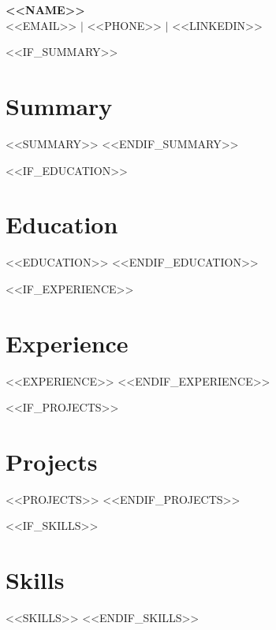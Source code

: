 \documentclass[11pt]{article}
\begin{document}
\begin{center}
    {\fontsize{36}{36}\selectfont\textbf{<<NAME>>}} \\ \bigskip
    {\color{icnclr}\faEnvelope[regular]} <<EMAIL>> $|$ 
    {\color{icnclr}} <<PHONE>> $|$
    {\color{icnclr}\faLinkedinIn} <<LINKEDIN>>
\end{center}

<<IF_SUMMARY>>
\section{Summary}
<<SUMMARY>>
<<ENDIF_SUMMARY>>

<<IF_EDUCATION>>
\section{Education}
<<EDUCATION>>
<<ENDIF_EDUCATION>>

<<IF_EXPERIENCE>>
\section{Experience}
<<EXPERIENCE>>
<<ENDIF_EXPERIENCE>>

<<IF_PROJECTS>>
\section{Projects}
<<PROJECTS>>
<<ENDIF_PROJECTS>>

<<IF_SKILLS>>
\section{Skills}
<<SKILLS>>
<<ENDIF_SKILLS>>
\end{document}
